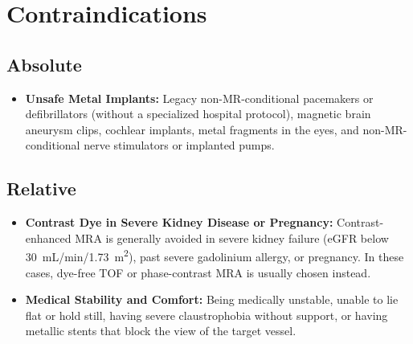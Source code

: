 \section{Contraindications}

\subsection{Absolute}
\begin{itemize}
\item \textbf{Unsafe Metal Implants:} Legacy non-MR-conditional pacemakers or defibrillators (without a specialized hospital protocol), magnetic brain aneurysm clips, cochlear implants, metal fragments in the eyes, and non-MR-conditional nerve stimulators or implanted pumps.
\end{itemize}

\subsection{Relative}
\begin{itemize}
\item \textbf{Contrast Dye in Severe Kidney Disease or Pregnancy:} Contrast-enhanced MRA is generally avoided in severe kidney failure (eGFR below 30~mL/min/1.73~m\textsuperscript{2}), past severe gadolinium allergy, or pregnancy. In these cases, dye-free TOF or phase-contrast MRA is usually chosen instead.
\item \textbf{Medical Stability and Comfort:} Being medically unstable, unable to lie flat or hold still, having severe claustrophobia without support, or having metallic stents that block the view of the target vessel.
\end{itemize}


